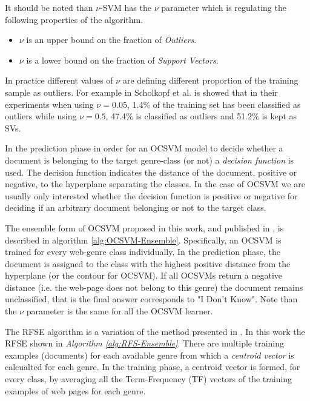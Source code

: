 It should be noted than $\nu$-SVM has the $\nu$ parameter which is regulating the following properties of the algorithm.
\begin{itemize}
\item $\nu$ is an upper bound on the fraction of \textit{Outliers}.
\item $\nu$ is a lower bound on the fraction of \textit{Support Vectors}.
\end{itemize}

In practice different values of $\nu$ are defining different proportion of the training sample as outliers. For example in Scholkopf et al.  is showed that in their experiments when using $\nu=0.05$, 1.4\% of the training set has been classified as outliers while using $\nu=0.5$, 47.4\% is classified as outliers and 51.2\% is kept as SVs.

In the prediction phase in order for an OCSVM model to decide whether a document is belonging to the target genre-class (or not) a \textit{decision function} is used. The decision function indicates the distance of the document, positive or negative, to the hyperplane separating the classes. In the case of OCSVM we are usually only interested whether the decision function is positive or negative for deciding if an arbitrary document belonging or not to the target class.

The ensemble form of  OCSVM proposed in this work, and published in , is described in algorithm \ref{alg:OCSVM-Ensemble}. Specifically, an OCSVM is trained for every web-genre class individually. In the prediction phase, the document is assigned to the class with the highest positive distance from the hyperplane (or the contour for OCSVM). If all OCSVMs return a negative distance (i.e. the web-page does not belong to this genre) the document remains unclassified, that is the final answer corresponds to "I Don't Know". Note than the $\nu$ parameter is the same for all the OCSVM learner. 

The RFSE algorithm is a variation of the method presented in . In this work the RFSE shown in \textit{Algorithm \ref{alg:RFS-Ensemble}}. There are multiple training examples (documents) for each available genre from which a \textit{centroid vector} is calcualted for each genre. In the training phase, a centroid vector is formed, for every class, by averaging all the Term-Frequency (TF) vectors of the training examples of web pages for each genre.


